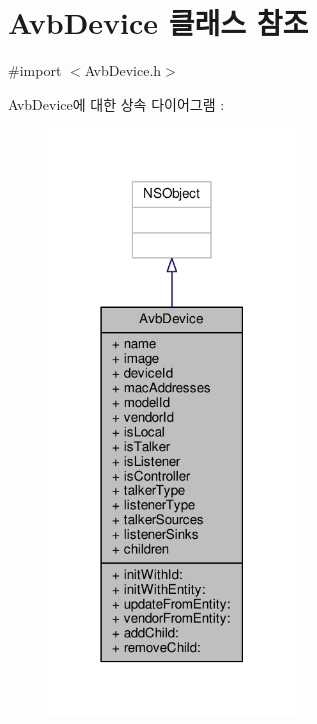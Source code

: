 \hypertarget{interface_avb_device}{}\section{Avb\+Device 클래스 참조}
\label{interface_avb_device}


{\ttfamily \#import $<$Avb\+Device.\+h$>$}



Avb\+Device에 대한 상속 다이어그램 \+: 
\nopagebreak
\begin{figure}[H]
\begin{center}
\leavevmode
\includegraphics[width=186pt]{interface_avb_device__inherit__graph}
\end{center}
\end{figure}


